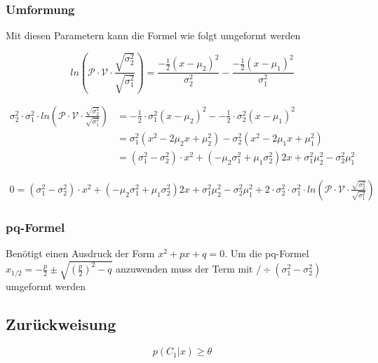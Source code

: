 \documentclass{article}
\begin{document}
\subsubsection{Umformung}
Mit diesen Parametern kann die Formel wie folgt umgeformt werden

\begin{equation} \label{trans:1}
ln(\mathcal{P} \cdot \mathcal{V} \cdot \frac{\sqrt{\sigma^{2}_2}}{\sqrt{\sigma^{2}_1}}) = \frac{-\frac{1}{2}(x-\mu_2)^2}{\sigma_{2}^2} - \frac{-\frac{1}{2}(x-\mu_1)^2}{\sigma_{1}^2}
\end{equation}

\begin{align}
\sigma_{2}^2 \cdot \sigma_{1}^2 \cdot ln(\mathcal{P} \cdot \mathcal{V} \cdot \frac{\sqrt{\sigma^{2}_2}}{\sqrt{\sigma^{2}_1}}) &= -\frac{1}{2} \cdot \sigma_{1}^2 (x-\mu_2)^2 - -\frac{1}{2} \cdot \sigma_{2}^2 (x-\mu_1)^2
\\
&=
\sigma_{1}^2 (x^2 - 2\mu_{2}x + \mu_{2}^2) - 
\sigma_{2}^2 (x^2- 2\mu_{1}x + \mu_{1}^2) 
\\
& = 
(\sigma_{1}^2 - \sigma_{2}^2) \cdot x^2 +
(-\mu_{2}\sigma_{1}^2 + \mu_{1} \sigma_{2}^2)2x 
+ \sigma_{1}^2 \mu_{2}^2 - \sigma_{2}^2\mu_{1}^2
\end{align}


\begin{equation}
\begin{aligned}
0 = 
(\sigma_{1}^2 - \sigma_{2}^2) \cdot x^2 +
(-\mu_{2}\sigma_{1}^2 + \mu_{1} \sigma_{2}^2)2x 
+ \sigma_{1}^2 \mu_{2}^2 - \sigma_{2}^2\mu_{1}^2
+ 2 \cdot \sigma_{2}^2 \cdot \sigma_{1}^2 \cdot ln(\mathcal{P} \cdot \mathcal{V} \cdot \frac{\sqrt{\sigma^{2}_2}}{\sqrt{\sigma^{2}_1}})
\end{aligned}
\end{equation}

\subsubsection{pq-Formel}
Benötigt einen Ausdruck der Form $x^2 + px +q = 0$.
Um die pq-Formel $x_{1/2} = - \frac{p}{2} \pm \sqrt{(\frac{p}{2})^2-q}$ anzuwenden muss der Term mit $/ \div (\sigma_{1}^2 - \sigma_{2}^2)$ umgeformt werden

\subsection{Zurückweisung}
$$p(C_1 | x) \ge \theta $$
\end{document}
